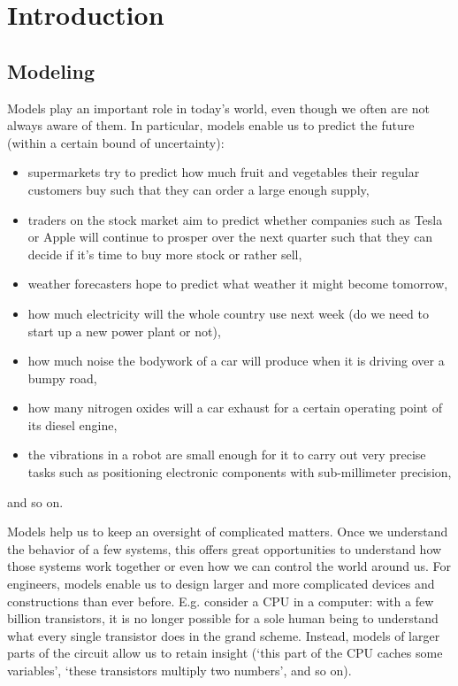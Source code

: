 \chapter{Introduction}
\def\thisDir{ch01-intro}
\glsresetall{}

\section{Modeling}
Models play an important role in today's world, even though we often are not always aware of them.
In particular, models enable us to predict the future (within a certain bound of uncertainty):
\begin{itemize}
  \item supermarkets try to predict how much fruit and vegetables their regular customers buy such that they can order a large enough supply,
  \item traders on the stock market aim to predict whether companies such as Tesla or Apple will continue to prosper over the next quarter such that they can decide if it's time to buy more stock or rather sell,
  \item weather forecasters hope to predict what weather it might become tomorrow,
  \item how much electricity will the whole country use next week (do we need to start up a new power plant or not),
  \item how much noise the bodywork of a car will produce when it is driving over a bumpy road,
  \item how many nitrogen oxides will a car exhaust for a certain operating point of its diesel engine, 
  \item the vibrations in a robot are small enough for it to carry out very precise tasks such as positioning electronic components with sub-millimeter precision,
\end{itemize}
and so on.

Models help us to keep an oversight of complicated matters.
Once we understand the behavior of a few systems, this offers great opportunities to understand how those systems work together or even how we can control the world around us.
For engineers, models enable us to design larger and more complicated devices and constructions than ever before.
E.g. consider a \gls{CPU} in a computer: with a few billion transistors, it is no longer possible for a sole human being to understand what every single transistor does in the grand scheme.
Instead, models of larger parts of the circuit allow us to retain insight (`this part of the \gls{CPU} caches some variables', `these transistors multiply two numbers', and so on).

